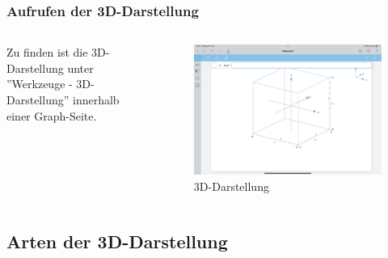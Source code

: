 \documentclass[10pt,ngerman]{beamer}
\begin{document}
\begin{frame}
	\frametitle{Aufrufen der 3D-Darstellung}

	\begin{columns}
		\begin{column}{0.5\textwidth}
			Zu finden ist die 3D-Darstellung unter ''Werkzeuge - 3D-Darstellung'' innerhalb einer Graph-Seite.
		\end{column}

		\begin{column}{0.5\textwidth}
			\begin{figure}
				\centering
				\includegraphics[width=\textwidth]{IMG_1444.png}
				\caption{3D-Darstellung}
			\end{figure}
		\end{column}
	\end{columns}

\end{frame}

\subsection{Arten der 3D-Darstellung}
\end{document}
